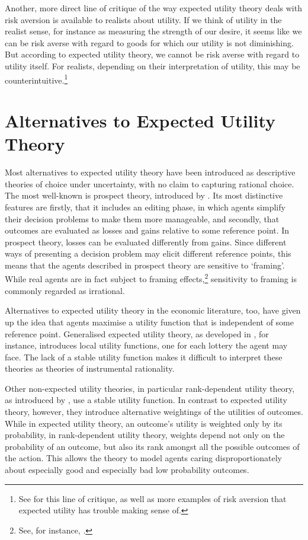 Another, more direct line of critique of the way expected utility theory deals with risk aversion is available to realists about utility. If we think of utility in the realist sense, for instance as measuring the strength of our desire, it seems like we can be risk averse with regard to goods for which our utility is not diminishing. But according to expected utility theory, we cannot be risk averse with regard to utility itself. For realists, depending on their interpretation of utility, this may be counterintuitive.\footnote{See \citet{Buchak2013} for this line of critique, as well as more examples of risk aversion that expected utility has trouble making sense of.}

\section{Alternatives to Expected Utility Theory}\label{s6}

Most alternatives to expected utility theory have been introduced as descriptive theories of choice under uncertainty, with no claim to capturing rational choice. The most well-known is prospect theory, introduced by \citet{KahnemanTversky1979}. Its most distinctive features are firstly, that it includes an editing phase, in which agents simplify their decision problems to make them more manageable, and secondly, that outcomes are evaluated as losses and gains relative to some reference point. In prospect theory, losses can be evaluated differently from gains. Since different ways of presenting a decision problem may elicit different reference points, this means that the agents described in prospect theory are sensitive to `framing'. While real agents are in fact subject to framing effects,\footnote{See, for instance, \citet{TverskyKahneman1981}.} sensitivity to framing is commonly regarded as irrational.

Alternatives to expected utility theory in the economic literature, too, have given up the idea that agents maximise a utility function that is independent of some reference point. Generalised expected utility theory, as developed in \citet{Machina1982}, for instance, introduces local utility functions, one for each lottery the agent may face. The lack of a stable utility function makes it difficult to interpret these theories as theories of instrumental rationality.

Other non-expected utility theories, in particular rank-dependent utility theory, as introduced by \citet{Quiggin1982}, use a stable utility function. In contrast to expected utility theory, however, they introduce alternative weightings of the utilities of outcomes. While in expected utility theory, an outcome's utility is weighted only by its probability, in rank-dependent utility theory, weights depend not only on the probability of an outcome, but also its rank amongst all the possible outcomes of the action. This allows the theory to model agents caring disproportionately about especially good and especially bad low probability outcomes.

